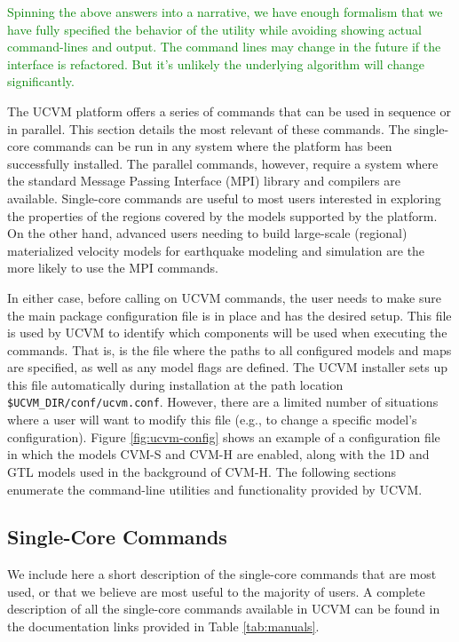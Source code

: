 \textcolor{green}{Spinning the above answers into a narrative, we have enough formalism that we have fully specified the behavior of the utility while avoiding showing actual command-lines and output. The command lines may change in the future if the interface is refactored. But it's unlikely the underlying algorithm will change significantly.}

The UCVM platform offers a series of commands that can be used in sequence or in parallel. This section details the most relevant of these commands. The single-core commands can be run in any system where the platform has been successfully installed. The parallel commands, however, require a system where the standard Message Passing Interface (MPI) library and compilers are available. Single-core commands are useful to most users interested in exploring the properties of the regions covered by the models supported by the platform. On the other hand, advanced users needing to build large-scale (regional) materialized velocity models for earthquake modeling and simulation are the more likely to use the MPI commands. 

In either case, before calling on UCVM commands, the user needs to make sure the main package configuration file is in place and has the desired setup. This file is used by UCVM to identify which components will be used when executing the commands. That is, is the file where the paths to all configured models and maps are specified, as well as any model flags are defined. The UCVM installer sets up this file automatically during installation at the path location \texttt{\$UCVM\_DIR/conf/ucvm.conf}. However, there are a limited number of situations where a user will want to modify this file (e.g., to change a specific model's configuration). Figure \ref{fig:ucvm-config} shows an example of a configuration file in which the models CVM-S and CVM-H are enabled, along with the 1D and GTL models used in the background of CVM-H. The following sections enumerate the command-line utilities and functionality provided by UCVM.



\subsection{Single-Core Commands}

We include here a short description of the single-core commands that are most used, or that we believe are most useful to the majority of users. A complete description of all the single-core commands available in UCVM can be found in the documentation links provided in Table \ref{tab:manuals}.

